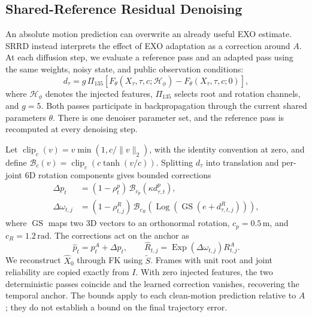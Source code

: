 \subsection{Shared-Reference Residual Denoising}
\label{sec:srrd}

An absolute motion prediction can overwrite an already useful EXO estimate. SRRD instead interprets the effect of EXO adaptation as a correction around $A$. At each diffusion step, we evaluate a reference pass and an adapted pass using the same weights, noisy state, and public observation conditions:
\begin{equation}
d_\tau=g\,\Pi_{135}\!\left[
 F_\theta(X_\tau,\tau,c;\mathcal H_\phi)
 -F_\theta(X_\tau,\tau,c;0)
\right],
\label{eq:difference}
\end{equation}
where $\mathcal H_\phi$ denotes the injected features, $\Pi_{135}$ selects root and rotation channels, and $g=5$. Both passes participate in backpropagation through the current shared parameters $\theta$. There is one denoiser parameter set, and the reference pass is recomputed at every denoising step.

Let $\operatorname{clip}_c(v)=v\min(1,c/\|v\|_2)$, with the identity convention at zero, and define $\mathcal B_c(v)=\operatorname{clip}_c(c\tanh(v/c))$. Splitting $d_\tau$ into translation and per-joint 6D rotation components gives bounded corrections
\begin{equation}
\begin{aligned}
\Delta p_t &=(1-\rho^p_t)\,
            \mathcal B_{c_p}(\kappa d^p_{\tau,t}),\\
\Delta\omega_{t,j}&=(1-\rho^R_{t,j})\,
 \mathcal B_{c_R}\!\left(
 \operatorname{Log}(\operatorname{GS}(e+d^R_{\tau,t,j}))
 \right),
\end{aligned}
\label{eq:bounds}
\end{equation}
where $\operatorname{GS}$ maps two 3D vectors to an orthonormal rotation, $c_p=0.5\,\mathrm{m}$, and $c_R=1.2\,\mathrm{rad}$. The corrections act on the anchor as
\begin{equation}
\widehat p_t=p^A_t+\Delta p_t,\qquad
\widehat R_{t,j}=
\operatorname{Exp}(\Delta\omega_{t,j})R^A_{t,j}.
\label{eq:repair}
\end{equation}
We reconstruct $\widehat X_0$ through FK using $\widetilde S$. Frames with unit root and joint reliability are copied exactly from $I$. With zero injected features, the two deterministic passes coincide and the learned correction vanishes, recovering the temporal anchor. The bounds apply to each clean-motion prediction relative to $A$; they do not establish a bound on the final trajectory error.

